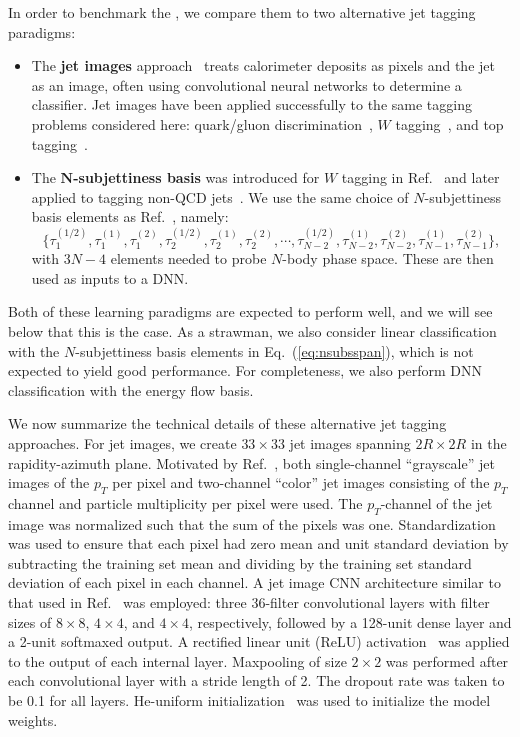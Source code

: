 \documentclass[letterpaper,11pt]{article}
\DeclareRobustCommand{\Eq}[1]{Eq.~(\ref{#1})}
\DeclareRobustCommand{\Ref}[1]{Ref.~\cite{#1}}
\newcommand{\Bs}{\text{EFPs}\xspace}
\begin{document}
In order to benchmark the \Bs, we compare them to two alternative jet tagging paradigms:
\begin{itemize}
\item The \textbf{jet images} approach~\cite{Cogan:2014oua} treats calorimeter deposits as pixels and the jet as an image, often using convolutional neural networks to determine a classifier. 
%
Jet images have been applied successfully to the same tagging problems considered here:  quark/gluon discrimination~\cite{Komiske:2016rsd}, $W$ tagging~\cite{deOliveira:2015xxd}, and top tagging~\cite{Kasieczka:2017nvn,Baldi:2016fql}.
%
\item The \textbf{$\boldsymbol{N}$-subjettiness basis} was introduced for $W$ tagging in \Ref{Datta:2017rhs} and later applied to tagging non-QCD jets~\cite{Aguilar-Saavedra:2017rzt}.
%
We use the same choice of $N$-subjettiness basis elements as \Ref{Datta:2017rhs}, namely:
\begin{equation}\label{eq:nsubsspan}
\{\tau_1^{(1/2)}, \tau_1^{(1)}, \tau_1^{(2)}, \tau_2^{(1/2)}, \tau_2^{(1)}, \tau_2^{(2)}, \cdots, \tau_{N-2}^{(1/2)}, \tau_{N-2}^{(1)}, \tau_{N-2}^{(2)}, \tau_{N-1}^{(1)}, \tau_{N-1}^{(2)}\},
\end{equation}
with $3N - 4$ elements needed to probe $N$-body phase space.  These are then used as inputs to a DNN.\end{itemize}
Both of these learning paradigms are expected to perform well, and we will see below that this is the case.
%
As a strawman, we also consider linear classification with the $N$-subjettiness basis elements in \Eq{eq:nsubsspan}, which is not expected to yield good performance.
%
For completeness, we also perform DNN classification with the energy flow basis.

We now summarize the technical details of these alternative jet tagging approaches.
%
For jet images, we create $33\times33$ jet images spanning $2R\times 2R$ in the rapidity-azimuth plane.
%
Motivated by \Ref{Komiske:2016rsd}, both single-channel ``grayscale'' jet images of the $p_T$ per pixel and two-channel ``color'' jet images consisting of the $p_T$ channel and particle multiplicity per pixel were used.
%
The $p_T$-channel of the jet image was normalized such that the sum of the pixels was one. 
%
Standardization was used to ensure that each pixel had zero mean and unit standard deviation by subtracting the training set mean and dividing by the training set standard deviation of each pixel in each channel.
%
A jet image CNN architecture similar to that used in \Ref{Komiske:2016rsd} was employed: three 36-filter convolutional layers with filter sizes of $8\times 8$, $4\times 4$, and $4\times 4$, respectively, followed by a 128-unit dense layer and a 2-unit softmaxed output. 
%
A rectified linear unit (ReLU) activation~\cite{nair2010rectified} was applied to the output of each internal layer.
%
Maxpooling of size $2\times2$ was performed after each convolutional layer with a stride length of 2.
%
The dropout rate was taken to be 0.1 for all layers.
%
He-uniform initialization~\cite{heuniform} was used to initialize the model weights. 
\end{document}
